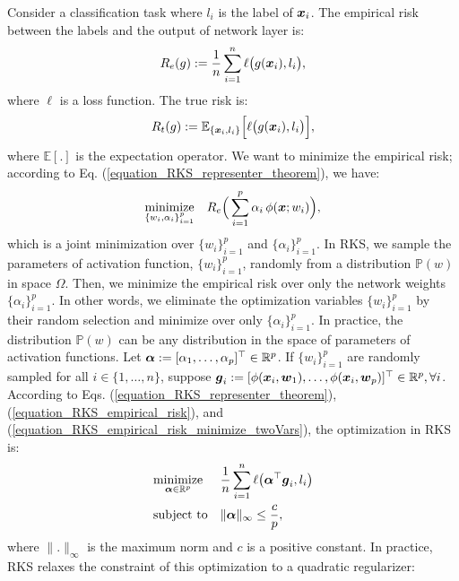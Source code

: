 \documentclass{article}
\def\b{\ensuremath\boldsymbol}
\begin{document}
Consider a classification task where $l_i$ is the label of $\b{x}_i$. The empirical risk between the labels and the output of network layer is:
\begin{align}\label{equation_RKS_empirical_risk}
R_e(g) := \frac{1}{n} \sum_{i=1}^n \ell\big(g(\b{x}_i), l_i\big),
\end{align}
where $\ell$ is a loss function. 
The true risk is:
\begin{align}\label{equation_RKS_true_risk}
R_t(g) := \mathbb{E}_{\{\b{x}_i, l_i\}}\Big[ \ell\big(g(\b{x}_i), l_i\big)\Big],
\end{align}
where $\mathbb{E}[.]$ is the expectation operator. 
We want to minimize the empirical risk; according to Eq. (\ref{equation_RKS_representer_theorem}), we have:
\begin{align}\label{equation_RKS_empirical_risk_minimize_twoVars}
\underset{\{w_i, \alpha_i\}_{i=1}^p}{\text{minimize}}\quad R_e\Big(\sum_{i=1}^p \alpha_i\, \phi(\b{x}; w_i)\Big),
\end{align}
which is a joint minimization over $\{w_i\}_{i=1}^p$ and $\{\alpha_i\}_{i=1}^p$. 
In RKS, we sample the parameters of activation function, $\{w_i\}_{i=1}^p$, randomly from a distribution $\mathbb{P}(w)$ in space $\Omega$. Then, we minimize the empirical risk over only the network weights $\{\alpha_i\}_{i=1}^p$. In other words, we eliminate the optimization variables $\{w_i\}_{i=1}^p$ by their random selection and minimize over only $\{\alpha_i\}_{i=1}^p$. In practice, the distribution $\mathbb{P}(w)$ can be any distribution in the space of parameters of activation functions. 
Let $\b{\alpha} := [\alpha_1, \dots, \alpha_p]^\top \in \mathbb{R}^p$. If $\{w_i\}_{i=1}^p$ are randomly sampled for all $i \in \{1, \dots, n\}$, suppose $\b{g}_i := [\phi(\b{x}_i, \b{w}_1), \dots, \phi(\b{x}_i, \b{w}_p)]^\top \in \mathbb{R}^p, \forall i$. 
According to Eqs. (\ref{equation_RKS_representer_theorem}), (\ref{equation_RKS_empirical_risk}), and (\ref{equation_RKS_empirical_risk_minimize_twoVars}), the optimization in RKS is:
\begin{equation}\label{equation_RKS_optimziation}
\begin{aligned}
& \underset{\b{\alpha} \in \mathbb{R}^p}{\text{minimize}}
& & \frac{1}{n} \sum_{i=1}^n \ell\big(\b{\alpha}^\top \b{g}_i, l_i\big) \\
& \text{subject to}
& & \|\b{\alpha}\|_\infty \leq \frac{c}{p},
\end{aligned}
\end{equation}
where $\|.\|_\infty$ is the maximum norm and $c$ is a positive constant. In practice, RKS relaxes the constraint of this optimization to a quadratic regularizer: 
\end{document}
